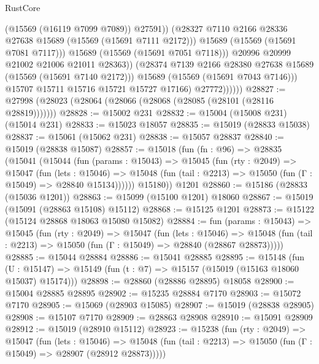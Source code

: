 \begin{lexlean}{RustCore}
\begin{coremodule}
                                (@15569 (@16119 @7099 @7089))
                                @27591))
                            (@28327 @7110 @2166 @28336 @27638 @15689 (@15569 (@15691 @7111 @2172)))
                            @15689
                            (@15569 (@15691 @7081 @7117)))
                          @15689
                          (@15569 (@15691 @7051 @7118)))
                        @20996
                        @20999
                        @21002
                        @21006
                        @21011
                        @28363))
                    (@28374 @7139 @2166 @28380 @27638 @15689 (@15569 (@15691 @7140 @2172)))
                    @15689
                    (@15569 (@15691 @7043 @7146)))
                  @15707
                  @15711
                  @15716
                  @15721
                  @15727
                  @17166)
                @27772))))))
@28827 := @27998 (@28023 (@28064 (@28066 (@28068 (@28085 (@28101 (@28116 @28819)))))))
@28828 := @15002 @231
@28832 := @15004 (@15008 @231) (@15014 @231)
@28833 := @15023 @18057
@28835 := @15019 (@28833 @15038)
@28837 := @15061 (@15062 @231)
@28838 := @15057 @28837
@28840 := @15019 (@28838 @15087)
@28857 := @15018
    (fun (fn : @96) =>
    @28835
      (@15041
        (@15044
          (fun (params : @15043) =>
          @15045
            (fun (rty : @2049) =>
            @15047
              (fun (lets : @15046) =>
              @15048 (fun (tail : @2213) => @15050 (fun (Γ : @15049) => @28840 @15134))))))
        @15180))
    @1201
@28860 := @15186 (@28833 (@15036 @1201))
@28863 := @15099 (@15100 @1201) @18060
@28867 := @15019 (@15091 (@28863 @15108) @15112)
@28868 := @15125 @1201
@28873 := @15122 (@15124 @28868 @18063 @15080 @15082)
@28884 := fun (params : @15043) =>
  @15045
    (fun (rty : @2049) =>
    @15047
      (fun (lets : @15046) =>
      @15048 (fun (tail : @2213) => @15050 (fun (Γ : @15049) => @28840 (@28867 @28873)))))
@28885 := @15044 @28884
@28886 := @15041 @28885
@28895 := @15148
    (fun (U : @15147) => @15149 (fun (t : @7) => @15157 (@15019 (@15163 @18060 @15037) @15174)))
@28898 := @28860 (@28886 @28895) @18058
@28900 := @15004 @28885 @28895
@28902 := @15235 @28884 @7170
@28903 := @15072 @7170
@28905 := @15069 (@28903 @15085)
@28907 := @15019 (@28838 @28905)
@28908 := @15107 @7170
@28909 := @28863 @28908
@28910 := @15091 @28909
@28912 := @15019 (@28910 @15112)
@28923 := @15238
    (fun (rty : @2049) =>
    @15047
      (fun (lets : @15046) =>
      @15048 (fun (tail : @2213) => @15050 (fun (Γ : @15049) => @28907 (@28912 @28873)))))

\end{coremodule}
\end{lexlean}
